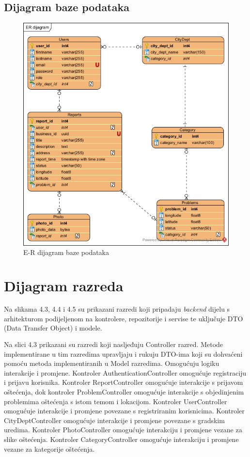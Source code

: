 \subsection{Dijagram baze podataka}

\begin{figure}[H]
	\includegraphics[scale=0.75]{slike/ERD-model} %
	\centering
	\caption{E-R dijagram baze podataka}
	\label{fig:ERdijagramBazePodataka}
\end{figure}

\eject


\section{Dijagram razreda}

Na slikama 4.3, 4.4 i 4.5 su prikazani razredi koji pripadaju \textit{backend} dijelu
s arhitekturom podijeljenom na kontrolere, repozitorije i servise te uključuje DTO
(Data Transfer Object) i modele. \newline

Na slici 4.3 prikazani su razredi koji nasljeđuju Controller razred. Metode implementirane u tim razredima 
upravljaju i rukuju DTO-ima koji su dohvaćeni pomoću metoda implementiranih u Model razredima. Omogućuju 
logiku interakcije i promjene. Kontroler AuthenticationController omogućuje registraciju i prijavu korisnika. 
Kontroler ReportController omogućuje interakcije s prijavom oštećenja, dok kontroler ProblemController omogućuje 
interakcije s objedinjenim problemima oštećenja s istom temom i lokacijom. Kontroler UserController omogućuje 
interakcije i promjene povezane s registriranim korisnicima. Kontroler CityDeptController omogućuje 
interakcije i promjene povezane s gradskim uredima. Kontroler PhotoController omogućuje interakciju i promjene
vezane za slike oštećenja. Kontroler CategoryController omogućuje interakciju i promjene vezane za 
kategorije oštećenja.

